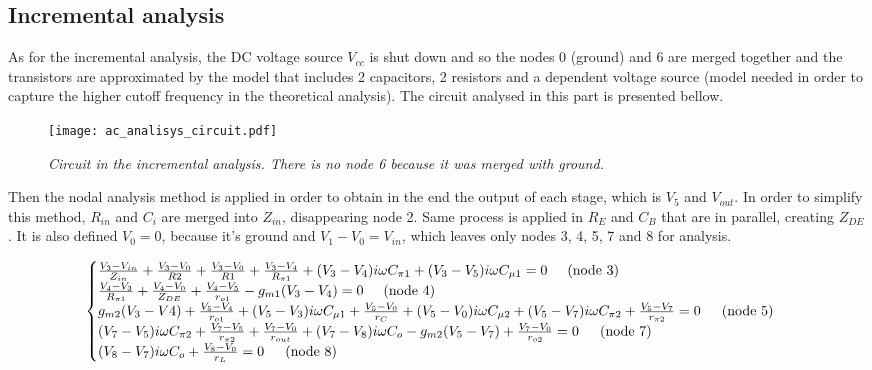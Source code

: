 \subsection{Incremental analysis}
As for the incremental analysis, the DC voltage source $V_{cc}$ is shut down and so the nodes 0 (ground) and 6 are merged together and the transistors are approximated by the model that includes 2 capacitors, 2 resistors and a dependent voltage source (model needed in order to capture the higher cutoff frequency in the theoretical analysis). The circuit analysed in this part is presented bellow.

\begin{figure}[H]
    \centering
    \texttt{[image: ac\_analisys\_circuit.pdf]}
            \caption{\textit{Circuit in the incremental analysis. There is no node 6 because it was merged with ground.}}
    \label{fig:incrementalscheme}
\end{figure}

Then the nodal analysis method is applied in order to obtain in the end the output of each stage, which is $V_5$ and $V_{out}$. In order to simplify this method, $R_{in}$ and $C_i$ are merged into $Z_{in}$, disappearing node 2. Same process is applied in $R_E$ and $C_B$ that are in parallel, creating $Z_{DE}$. It is also defined $V_{0}=0$, because it's ground and $V_{1}-V_{0}=V_{in}$, which leaves only nodes 3, 4, 5, 7 and 8 for analysis.


\begin{equation}
    \begin{cases}
        \frac{V_3-V_{in}}{Z_{in}}+\frac{V_3-V_0}{R2}+\frac{V_3-V_0}{R1}+\frac{V_3-V_4}{R_{\pi1}}+(V_3-V_4)i \omega C_{\pi1}+(V_3-V_5)i \omega C_{\mu1}=0 \hspace{5mm}\text{(node 3)}\\
        \frac{V_4-V_3}{R_{\pi1}}+\frac{V_4-V_0}{Z_{DE}}+\frac{V_4-V_5}{r_{o1}}-g_{m1}(V_3-V_4)=0 \hspace{5mm}\text{(node 4)}\\
        g_{m2}(V_3-V4)+\frac{V_5-V_4}{r_{o1}}+(V_5-V_3)i \omega C_{\mu1}+\frac{V_5-V_0}{r_{C}}+(V_5-V_0)i \omega C_{\mu2}+(V_5-V_7)i \omega C_{\pi2}+\frac{V_5-V_7}{r_{\pi2}}  = 0 \hspace{15px}\text{(node 5)}\\
        (V_7-V_5)i \omega C_{\pi2}+\frac{V_7-V_5}{r_{\pi2}}+\frac{V_7-V_0}{r_{out}}+(V_7-V_8)i \omega C_o -g_{m2}(V_5-V_7)+\frac{V_7-V_0}{r_{o2}}  = 0 \hspace{15px}\text{(node 7)}\\
        (V_8-V_7)i \omega C_o+\frac{V_8-V_0}{r_{L}}  = 0 \hspace{15px}\text{(node 8)}\\
    \end{cases}
\end{equation}

